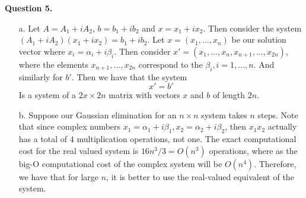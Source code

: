 \documentclass{article}
\begin{document}
\textbf{Question 5.}
\begin{itemize}
    \item[a.] Let $A=A_1+iA_2$, $b=b_1+ib_2$ and $x=x_1+ix_2$. Then consider the system $(A_1+iA_2)(x_1+ix_2)=b_1+ib_2$. Let $x=(x_1,...,x_n)$ be our solution vector where $x_i=\alpha_i + i \beta_i$. Then consider $x'=(x_1,...,x_{n}, x_{n+1},...,x_{2n})$, where the elements $x_{n+1},...,x_{2n}$ correspond to the $\beta_i, i=1,...,n$. And similarly for $b'$. Then we have that the system 
    \begin{equation*}
        [A_1 A_2]x' = b'
    \end{equation*} 
    Is a system of a $2x \times 2n$ matrix with vectors $x$ and $b$ of length $2n$. 
    \item[b.] Suppose our Gaussian elimination for an $n\times n$ system takes $n$ steps. Note that since complex numbers $x_1 = \alpha_1 + i\beta_1, x_2=\alpha_2 + i \beta_2$, then $x_1 x_2$ actually has a total of $4$ multiplication operations, not one. The exact computational cost for the real valued system is $16n^3/3=O(n^3)$ operations, where as the big-O computational cost of the complex system will be $O(n^4)$. Therefore, we have that for large $n$, it is better to use the real-valued equivalent of the system. 
\end{itemize}
\end{document}
